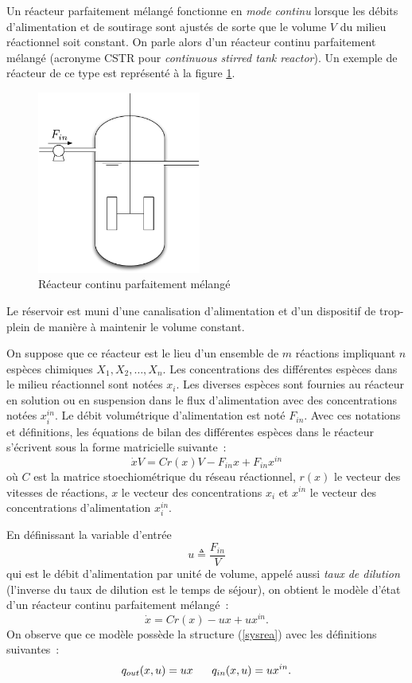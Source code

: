 Un réacteur parfaitement mélangé fonctionne en {\em mode continu} lorsque les
débits d'alimentation et de soutirage sont ajustés de sorte que le volume $V$
du milieu réactionnel soit constant. On parle alors d'un réacteur continu
parfaitement mélangé (acronyme CSTR pour {\em
continuous stirred tank reactor}). Un exemple de réacteur de ce type est
représenté à la figure \ref{Fig:CSTR}. 
\begin{figure}[htbp] 
   \centering
   \includegraphics[height=6cm]{CSTR} 
   \caption{Réacteur continu parfaitement mélangé}
   \label{Fig:CSTR}
\end{figure}
Le réservoir est muni d'une canalisation d'alimentation et d'un dispositif de
trop-plein de manière à maintenir le volume constant.

On suppose que ce réacteur est le lieu d'un ensemble de $m$ réactions
impliquant $n$ espèces chimiques $X_1, X_2, \dots , X_n$. Les concentrations
des différentes espèces dans le milieu réactionnel sont notées  $x_i$. Les
diverses espèces sont fournies au réacteur en solution ou en suspension dans
le flux d'alimentation avec des concentrations notées $x_i^{in}$.
Le débit volumétrique d'alimentation est noté $F_{in}$. Avec ces notations et
définitions, les équations de bilan des différentes espèces dans le réacteur
s'écrivent sous la forme matricielle suivante~:
$$
\dot xV = Cr(x)V - F_{in}x + F_{in}x^{in}
$$
où $C$ est la matrice stoechiométrique du réseau réactionnel, $r(x)$ le vecteur
des vitesses de réactions, $x$ le vecteur des concentrations $x_i$ et $x^{in}$ le
vecteur des concentrations d'alimentation $x_i^{in}$.

En définissant la variable
d'entrée
$$ 
u \triangleq \frac{F_{in}}{V}
$$
qui est le débit d'alimentation par unité de volume, appelé aussi {\em taux de
dilution} (l'inverse du taux de dilution est le temps de séjour), on obtient le
modèle d'état d'un réacteur continu parfaitement mélangé~:
$$
\dot x = Cr(x) - ux + ux^{in}. \label{CSTR}
$$
On observe que ce modèle possède la structure (\ref{sysrea}) avec les
définitions suivantes~:
$$
q_{out}(x,u) = ux \hh \hh \hh q_{in}(x,u) = ux^{in}.
$$

